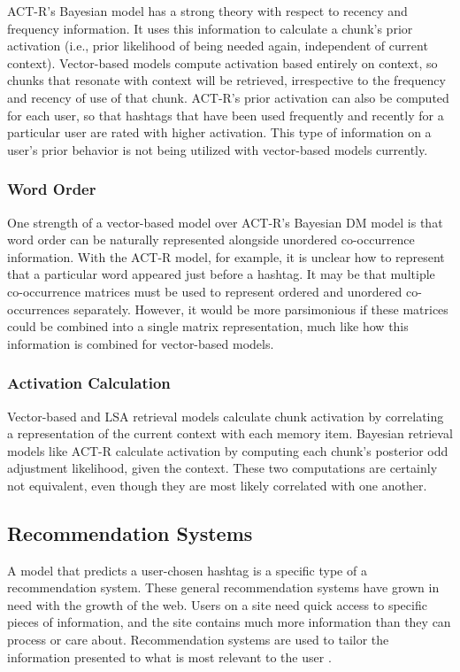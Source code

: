 \documentclass[man,floatsintext,donotrepeattitle]{apa6}
\begin{document}
ACT-R's Bayesian model has a strong theory with respect to recency and frequency information.
It uses this information to calculate a chunk's prior activation (i.e., prior likelihood of being needed again, independent of current context).
Vector-based models compute activation based entirely on context, so chunks that resonate with context will be retrieved, irrespective to the frequency and recency of use of that chunk.
ACT-R's prior activation can also be computed for each user, so that hashtags that have been used frequently and recently for a particular user are rated with higher activation.
This type of information on a user's prior behavior is not being utilized with vector-based models currently.

\subsubsection{Word Order}

One strength of a vector-based model over ACT-R's Bayesian DM model is that word order can be naturally represented alongside unordered co-occurrence information.
With the ACT-R model, for example, it is unclear how to represent that a particular word appeared just before a hashtag. 
It may be that multiple co-occurrence matrices must be used to represent ordered and unordered co-occurrences separately.
However, it would be more parsimonious if these matrices could be combined into a single matrix representation, much like how this information is combined for vector-based models.

\subsubsection{Activation Calculation}

Vector-based and LSA retrieval models calculate chunk activation by correlating a representation of the current context with each memory item.
Bayesian retrieval models like ACT-R calculate activation by computing each chunk's posterior odd adjustment likelihood, given the context.
These two computations are certainly not equivalent, even though they are most likely correlated with one another.

\subsection{Recommendation Systems}

A model that predicts a user-chosen hashtag is a specific type of a recommendation system.
These general recommendation systems have grown in need with the growth of the web.
Users on a site need quick access to specific pieces of information, and the site contains much more information than they can process or care about.
Recommendation systems are used to tailor the information presented to what is most relevant to the user \parencite{Pazzani2007}.
\end{document}
